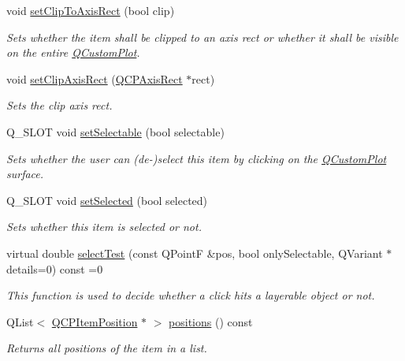 \begin{DoxyCompactItemize}
\item 
void \hyperlink{classQCPAbstractItem_a39e05b9d4176b9accafc746d16ca6a06}{set\+Clip\+To\+Axis\+Rect} (bool clip)
\begin{DoxyCompactList}\small\item\em Sets whether the item shall be clipped to an axis rect or whether it shall be visible on the entire \hyperlink{classQCustomPlot}{Q\+Custom\+Plot}. \end{DoxyCompactList}\item 
void \hyperlink{classQCPAbstractItem_a7dc75fcbcd10206fe0b75d757ea7a347}{set\+Clip\+Axis\+Rect} (\hyperlink{classQCPAxisRect}{Q\+C\+P\+Axis\+Rect} $\ast$rect)
\begin{DoxyCompactList}\small\item\em Sets the clip axis rect. \end{DoxyCompactList}\item 
Q\+\_\+\+S\+L\+O\+T void \hyperlink{classQCPAbstractItem_a8a8e32a55bc478b849756a78c2d87fd2}{set\+Selectable} (bool selectable)
\begin{DoxyCompactList}\small\item\em Sets whether the user can (de-\/)select this item by clicking on the \hyperlink{classQCustomPlot}{Q\+Custom\+Plot} surface. \end{DoxyCompactList}\item 
Q\+\_\+\+S\+L\+O\+T void \hyperlink{classQCPAbstractItem_a203de94ad586cc44d16c9565f49d3378}{set\+Selected} (bool selected)
\begin{DoxyCompactList}\small\item\em Sets whether this item is selected or not. \end{DoxyCompactList}\item 
virtual double \hyperlink{classQCPAbstractItem_aa7055ea577888915c52170eb8b8d1bc6}{select\+Test} (const Q\+Point\+F \&pos, bool only\+Selectable, Q\+Variant $\ast$details=0) const  =0
\begin{DoxyCompactList}\small\item\em This function is used to decide whether a click hits a layerable object or not. \end{DoxyCompactList}\item 
Q\+List$<$ \hyperlink{classQCPItemPosition}{Q\+C\+P\+Item\+Position} $\ast$ $>$ \hyperlink{classQCPAbstractItem_adf6a680cc29a6bce8345c3b6af3a91a1}{positions} () const 
\begin{DoxyCompactList}\small\item\em Returns all positions of the item in a list. \end{DoxyCompactList}\item 

\end{DoxyCompactItemize}
